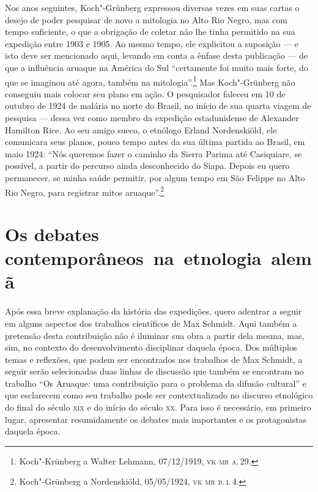 Nos anos seguintes, Koch"-Grünberg expressou diversas vezes em suas
cartas o desejo de poder pesquisar de novo a mitologia no Alto Rio
Negro, mas com tempo suficiente, o que a obrigação de coletar não lhe
tinha permitido na sua expedição entre 1903 e 1905. Ao mesmo tempo, ele
explicitou a suposição --- e isto deve ser mencionado aqui, levando em
conta a ênfase desta publicação --- de que a influência aruaque na
América do Sul ``certamente foi muito mais forte, do que se imaginou até
agora, também na mitologia''.\footnote{Koch"-Krünberg a Walter Lehmann,
  07/12/1919, \textsc{vk mr a.\,29}.} Mas Koch"-Grünberg não conseguiu mais
colocar seu plano em ação. O pesquisador faleceu em 10 de outubro de
1924 de malária no norte do Brasil, no início de sua quarta viagem de
pesquisa --- dessa vez como membro da expedição estadunidense de
Alexander Hamilton Rice. Ao seu amigo sueco, o etnólogo
Erland Nordenskiöld, ele comunicara seus planos, pouco tempo
antes da sua última partida ao Brasil, em maio 1924: ``Nós queremos
fazer o caminho da Sierra Parima até Casiquiare, se possível, a partir
do percurso ainda desconhecido do Siapa. Depois eu quero permanecer, se
minha saúde permitir, por algum tempo em São Felippe no Alto Rio Negro,
para registrar mitos aruaque''.\footnote{Koch"-Grünberg a Nordenskiöld,
  05/05/1924, \textsc{vk mr b.\,i.\,4}.}

\section{Os debates contemporâneos~na~etnologia~alemã}
Após essa breve explanação da história das expedições, quero adentrar a
seguir em alguns aspectos dos trabalhos científicos de Max Schmidt.
Aqui também a pretensão desta contribuição não é iluminar sua obra a
partir dela mesma, mas, sim, no contexto do desenvolvimento disciplinar
daquela época. Dos múltiplos temas e reflexões, que podem ser
encontrados nos trabalhos de Max Schmidt, a seguir serão selecionadas
duas linhas de discussão que também se encontram no trabalho ``Os
Aruaque: uma contribuição para o problema da difusão cultural'' e que
esclarecem como seu trabalho pode ser contextualizado no discurso
etnológico do final do século \textsc{xix} e do início do século \textsc{xx}. Para isso é
necessário, em primeiro lugar, apresentar resumidamente os debates mais
importantes e os protagonistas daquela época.

